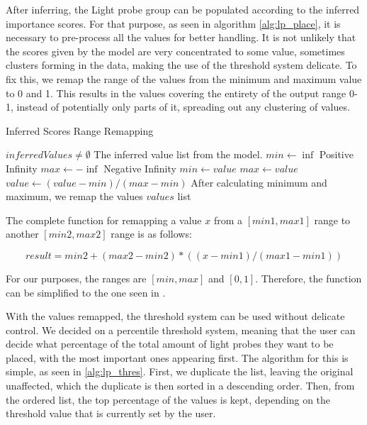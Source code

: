 After inferring, the Light probe group can be populated according to the inferred importance scores. For that purpose, as seen in algorithm \ref{alg:lp_place}, it is necessary to pre-process all the values for better handling. It is not unlikely that the scores given by the model are very concentrated to some value, sometimes clusters forming in the data, making the use of the threshold system delicate. To fix this, we remap the range of the values from the minimum and maximum value to 0 and 1. This results in the values covering the entirety of the output range 0-1, instead of potentially only parts of it, spreading out any clustering of values.

\begin{algorithm}
	\caption{Inferred Scores Range Remapping}
	\label{alg:lp_place}
	\begin{algorithmic}[1]
		\Require $inferredValues \neq \emptyset$
		\Comment The inferred value list from the model.
		\State $min \gets \inf$
		\Comment Positive Infinity
		\State $max \gets -\inf$
		\Comment Negative Infinity
				\State $min \gets value$
				\State $max \gets value$
			\EndIf
		\EndFor
			\State $value \gets (value - min) / (max - min)$
			\Comment After calculating minimum and maximum, we remap the values
			\label{alg:lp_place:11}
		\EndFor
		\State \Return $values$ list
	\end{algorithmic}
\end{algorithm}

The complete function for remapping a value $x$ from a \([min1, max1]\) range to another \([min2, max2]\) range is as follows:

\[ result = min2 + (max2 - min2) * ((x - min1)/(max1 - min1)) \]

For our purposes, the ranges are \([min, max]\) and \([0, 1]\). Therefore, the function can be simplified to the one seen in .

With the values remapped, the threshold system can be used without delicate control. We decided on a percentile threshold system, meaning that the user can decide what percentage of the total amount of light probes they want to be placed, with the most important ones appearing first. The algorithm for this is simple, as seen in \ref{alg:lp_thres}. First, we duplicate the list, leaving the original unaffected, which the duplicate is then sorted in a descending order. Then, from the ordered list, the top percentage of the values is kept, depending on the threshold value that is currently set by the user.


